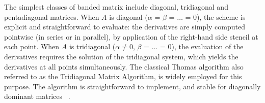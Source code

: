 The simplest classes of banded matrix include
diagonal, tridiagonal and pentadiagonal matrices.
When $A$ is diagonal ($\alpha$ = $\beta$ = $\hdots$ = 0),
the scheme is explicit and straightforward to evaluate:
the derivatives are simply computed pointwise
(in series or in parallel),
by application of the right-hand side stencil at each point.
When $A$ is tridiagonal ($\alpha \neq 0$, $\beta$ = $\hdots$ = 0),
the evaluation of the derivatives requires the solution
of the tridiagonal system, which yields the derivatives
at all points simultaneously.
The classical Thomas algorithm
also referred to as the Tridiagonal Matrix Algorithm,
is widely employed for this purpose.
The algorithm is straightforward to implement,
and stable for diagonally dominant matrices ~\cite{numericalrecipes}.

